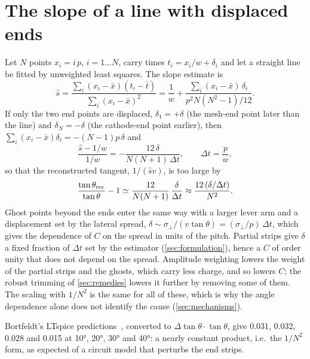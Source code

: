 \section{The slope of a line with displaced ends}\label{app:endterm}

Let $N$ points $x_i = i\,p$, $i = 1 \dots N$, carry times $t_i = x_i/w + \delta_i$ and let a straight line be fitted by
unweighted least squares. The slope estimate is
\begin{equation}
  \hat s = \frac{\sum_i (x_i - \bar x)(t_i - \bar t)}{\sum_i (x_i - \bar x)^2}
        = \frac{1}{w} + \frac{\sum_i (x_i - \bar x)\,\delta_i}{p^2 N(N^2-1)/12}.
\end{equation}
If only the two end points are displaced, $\delta_1 = +\delta$ (the mesh-end point later than the line) and $\delta_N = -\delta$
(the cathode-end point earlier), then $\sum_i (x_i - \bar x)\delta_i = -(N-1)p\,\delta$ and
\begin{equation}
  \frac{\hat s - 1/w}{1/w} = -\frac{12\,\delta}{N(N+1)\,\Delta t}, \qquad \Delta t = \frac{p}{w},
\end{equation}
so that the reconstructed tangent, $1/(\hat s v)$, is too large by
\begin{equation}
  \frac{\tan\theta_{\rm rec}}{\tan\theta} - 1 \simeq \frac{12}{N(N+1)}\,\frac{\delta}{\Delta t} \approx \frac{12\,(\delta/\Delta t)}{N^2}.
\end{equation}
Ghost points beyond the ends enter the same way with a larger lever arm and a displacement set by the lateral spread,
$\delta \sim \sigma_\perp/(v\tan\theta) = (\sigma_\perp/p)\,\Delta t$, which gives the dependence of $C$ on the spread in units of the
pitch. Partial strips give $\delta$ a fixed fraction of $\Delta t$ set by the estimator (\cref{sec:formulation}), hence a $C$ of
order unity that does not depend on the spread. Amplitude weighting lowers the weight of the partial strips and the ghosts,
which carry less charge, and so lowers $C$; the robust trimming of \cref{sec:remedies} lowers it further by removing some of
them. The scaling with $1/N^2$ is the same for all of these, which is why the angle dependence alone does not identify the
cause (\cref{sec:mechanisms}).

Bortfeldt's LTspice predictions~\cite{Bortfeldt2014}, converted to $\Delta\tan\theta\cdot\tan\theta$, give 0.031, 0.032, 0.028
and 0.015 at \ang{10}, \ang{20}, \ang{30} and \ang{40}: a nearly constant product, i.e.\ the $1/N^2$ form, as expected of a circuit
model that perturbs the end strips.
